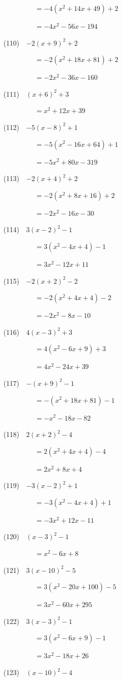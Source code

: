 \documentclass[a4j,twocolumn,10pt,fleqn]{jarticle}
\begin{document}
~~~~~~~~~$=-4(x^2 +14x +49) +2$

~~~~~~~~~$=-4x^2-56x-194$

(110)~~$-2(x +9)^2 +2$

~~~~~~~~~$=-2(x^2 +18x +81) +2$

~~~~~~~~~$=-2x^2-36x-160$

(111)~~$(x +6)^2 +3$

~~~~~~~~~$=x^2 +12x +39$

(112)~~$-5(x-8)^2 +1$

~~~~~~~~~$=-5(x^2-16x +64) +1$

~~~~~~~~~$=-5x^2 +80x-319$

(113)~~$-2(x +4)^2 +2$

~~~~~~~~~$=-2(x^2 +8x +16) +2$

~~~~~~~~~$=-2x^2-16x-30$

(114)~~$3(x-2)^2-1$

~~~~~~~~~$=3(x^2-4x +4)-1$

~~~~~~~~~$=3x^2-12x +11$

(115)~~$-2(x +2)^2-2$

~~~~~~~~~$=-2(x^2 +4x +4)-2$

~~~~~~~~~$=-2x^2-8x-10$

(116)~~$4(x-3)^2 +3$

~~~~~~~~~$=4(x^2-6x +9) +3$

~~~~~~~~~$=4x^2-24x +39$

(117)~~$-(x +9)^2-1$

~~~~~~~~~$=-(x^2 +18x +81)-1$

~~~~~~~~~$=-x^2-18x-82$

(118)~~$2(x +2)^2-4$

~~~~~~~~~$=2(x^2 +4x +4)-4$

~~~~~~~~~$=2x^2 +8x +4$

(119)~~$-3(x-2)^2 +1$

~~~~~~~~~$=-3(x^2-4x +4) +1$

~~~~~~~~~$=-3x^2 +12x-11$

(120)~~$(x-3)^2-1$

~~~~~~~~~$=x^2-6x +8$

(121)~~$3(x-10)^2-5$

~~~~~~~~~$=3(x^2-20x +100)-5$

~~~~~~~~~$=3x^2-60x +295$

(122)~~$3(x-3)^2-1$

~~~~~~~~~$=3(x^2-6x +9)-1$

~~~~~~~~~$=3x^2-18x +26$

(123)~~$(x-10)^2-4$
\end{document}
